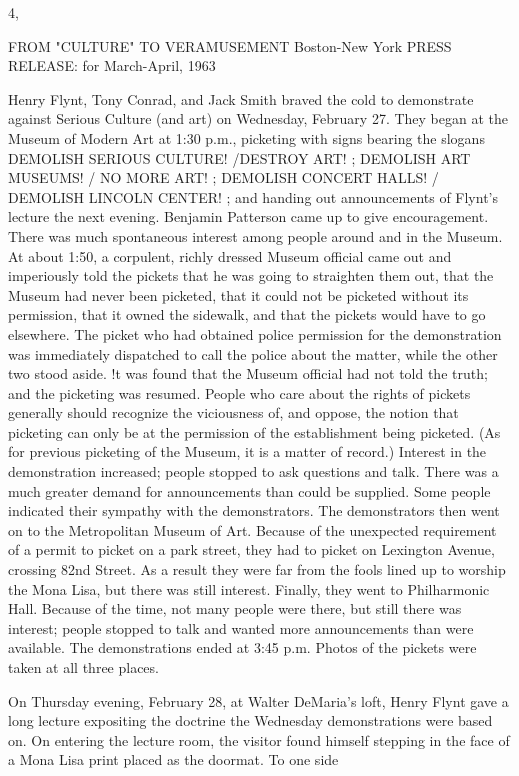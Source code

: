 \documentclass[10pt,twoside]{memoir}
\begin{document}
\begin{enumerate}
{{{{{{{{{{{{{{{4, 


FROM "CULTURE" TO VERAMUSEMENT 
Boston-New York 
PRESS RELEASE: for March-April, 1963 


Henry Flynt, Tony Conrad, and Jack Smith braved the cold to demonstrate 
against Serious Culture (and art) on Wednesday, February 27. They began at 
the Museum of Modern Art at 1:30 p.m., picketing with signs bearing the 
slogans DEMOLISH SERIOUS CULTURE! /DESTROY ART! ; DEMOLISH 
ART MUSEUMS! / NO MORE ART! ; DEMOLISH CONCERT HALLS! / 
DEMOLISH LINCOLN CENTER! ; and handing out announcements of 
Flynt's lecture the next evening. Benjamin Patterson came up to give 
encouragement. There was much spontaneous interest among people around 
and in the Museum. At about 1:50, a corpulent, richly dressed Museum 
official came out and imperiously told the pickets that he was going to 
straighten them out, that the Museum had never been picketed, that it could 
not be picketed without its permission, that it owned the sidewalk, and that 
the pickets would have to go elsewhere. The picket who had obtained police 
permission for the demonstration was immediately dispatched to call the 
police about the matter, while the other two stood aside. !t was found that 
the Museum official had not told the truth; and the picketing was resumed. 
People who care about the rights of pickets generally should recognize the 
viciousness of, and oppose, the notion that picketing can only be at the 
permission of the establishment being picketed. (As for previous picketing of 
the Museum, it is a matter of record.) Interest in the demonstration 
increased; people stopped to ask questions and talk. There was a much 
greater demand for announcements than could be supplied. Some people 
indicated their sympathy with the demonstrators. The demonstrators then 
went on to the Metropolitan Museum of Art. Because of the unexpected 
requirement of a permit to picket on a park street, they had to picket on 
Lexington Avenue, crossing 82nd Street. As a result they were far from the 
fools lined up to worship the Mona Lisa, but there was still interest. Finally, 
they went to Philharmonic Hall. Because of the time, not many people were 
there, but still there was interest; people stopped to talk and wanted more 
announcements than were available. The demonstrations ended at 3:45 p.m. 
Photos of the pickets were taken at all three places. 

On Thursday evening, February 28, at Walter DeMaria's loft, Henry Flynt 
gave a long lecture expositing the doctrine the Wednesday demonstrations 
were based on. On entering the lecture room, the visitor found himself 
stepping in the face of a Mona Lisa print placed as the doormat. To one side 


}}}}}}}}}}}}}}}
\end{enumerate}
\end{document}
